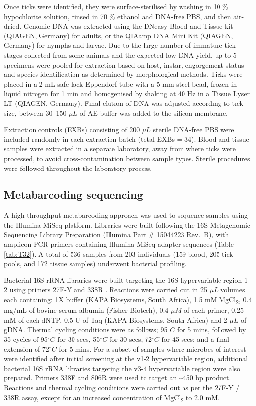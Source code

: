 \documentclass[a4paper, nobind]{templates/ociamthesis}
\begin{document}
Once ticks were identified, they were surface-sterilised by washing in 10 \% hypochlorite solution, rinsed in 70 \% ethanol and DNA-free PBS, and then air-dried.
Genomic DNA was extracted using the DNeasy Blood and Tissue kit (QIAGEN, Germany) for adults, or the QIAamp DNA Mini Kit (QIAGEN, Germany) for nymphs and larvae.
Due to the large number of immature tick stages collected from some animals and the expected low DNA yield, up to 5 specimens were pooled for extraction based on host, instar, engorgement status and species identification as determined by morphological methods.
Ticks were placed in a 2 mL safe lock Eppendorf tube with a 5 mm steel bead, frozen in liquid nitrogen for 1 min and homogenised by shaking at 40 Hz in a Tissue Lyser LT (QIAGEN, Germany).
Final elution of DNA was adjusted according to tick size, between 30--150 \(\mu L\) of AE buffer was added to the silicon membrane.

Extraction controls (EXBs) consisting of 200 \(\mu L\) sterile DNA-free PBS were included randomly in each extraction batch (total EXBs = 34).
Blood and tissue samples were extracted in a separate laboratory, away from where ticks were processed, to avoid cross-contamination between sample types. Sterile procedures were followed throughout the laboratory process.

\hypertarget{metabarcoding-sequencing}{%
\subsection{Metabarcoding sequencing}\label{metabarcoding-sequencing}}

A high-throughput metabarcoding approach was used to sequence samples using the Illumina MiSeq platform. Libraries were built following the 16S Metagenomic Sequencing Library Preparation (Illumina Part \# 15044223 Rev.~B), with amplicon PCR primers containing Illumina MiSeq adapter sequences (Table \ref{tab:T32}).
A total of 536 samples from 203 individuals (159 blood, 205 tick pools, and 172 tissue samples) underwent bacterial profiling.

Bacterial 16S rRNA libraries were built targeting the 16S hypervariable region 1-2 using primers 27F-Y and 338R \autocite{goftonInhibitionEndosymbiontCandidatus2015}.
Reactions were carried out in 25 \(\mu L\) volumes each containing: 1X buffer (KAPA Biosystems, South Africa), 1.5 mM MgCl\textsubscript{2}, 0.4 mg/mL of bovine serum albumin (Fisher Biotech), 0.4 \(\mu M\) of each primer, 0.25 mM of each dNTP, 0.5 U of Taq (KAPA Biosystems, South Africa) and 2 \(\mu L\) of gDNA.
Thermal cycling conditions were as follows; 95\(^\circ C\) for 5 mins, followed by 35 cycles of 95\(^\circ C\) for 30 secs, 55\(^\circ C\) for 30 secs, 72\(^\circ C\) for 45 secs; and a final extension of 72\(^\circ C\) for 5 mins.
For a subset of samples where microbes of interest were identified after initial screening at the v1-2 hypervariable region, additional bacterial 16S rRNA libraries targeting the v3-4 hypervariable region were also prepared.
Primers 338F and 806R were used to target an \textasciitilde450 bp product.
Reactions and thermal cycling conditions were carried out as per the 27F-Y / 338R assay, except for an increased concentration of MgCl\textsubscript{2} to 2.0 mM.
\end{document}

